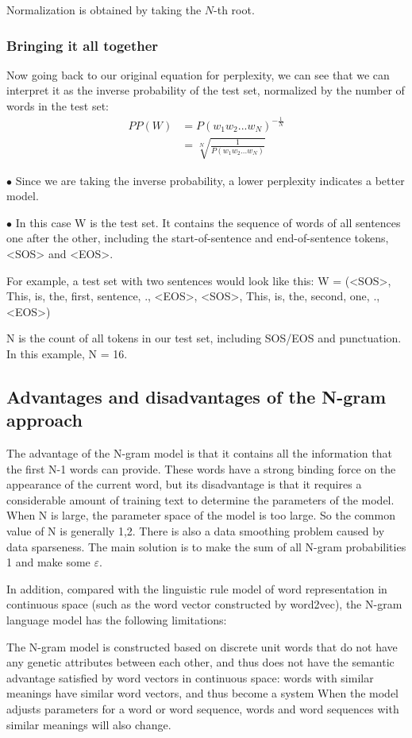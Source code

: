 Normalization is obtained by taking the $N$-th root.

\subsubsection{Bringing it all together}
Now going back to our original equation for perplexity, we can see that we can interpret it as the inverse probability of the test set, normalized by the number of words in the test set:
$$	\begin{aligned}
		PP(W)&=P(w_1w_2...w_N)^{-\frac{1}{N}}\\
		&=\sqrt[N]{\frac{1}{P(w_1w_2...w_N)}}
	\end{aligned}
$$

$\bullet$ Since we are taking the inverse probability, a lower perplexity indicates a better model.

$\bullet$ In this case W is the test set. It contains the sequence of words of all sentences one after the other, including the start-of-sentence and end-of-sentence tokens, <SOS> and <EOS>.

For example, a test set with two sentences would look like this: W = (<SOS>, This, is, the, first, sentence, ., <EOS>, <SOS>, This, is, the, second, one, ., <EOS>)

N is the count of all tokens in our test set, including SOS/EOS and punctuation. In this example, N = 16.
\subsection{Advantages and disadvantages of the N-gram approach}
The advantage of the N-gram model is that it contains all the information that the first N-1 words can provide. These words have a strong binding force on the appearance of the current word, but its disadvantage is that it requires a considerable amount of training text to determine the parameters of the model. When N is large, the parameter space of the model is too large. So the common value of N is generally 1,2. There is also a data smoothing problem caused by data sparseness. The main solution is to make the sum of all N-gram probabilities 1 and make some $\varepsilon$.

In addition, compared with the linguistic rule model of word representation in continuous space (such as the word vector constructed by word2vec), the N-gram language model has the following limitations:

The N-gram model is constructed based on discrete unit words that do not have any genetic attributes between each other, and thus does not have the semantic advantage satisfied by word vectors in continuous space: words with similar meanings have similar word vectors, and thus become a system When the model adjusts parameters for a word or word sequence, words and word sequences with similar meanings will also change.

